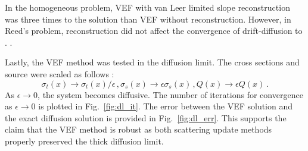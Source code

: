 In the homogeneous problem, VEF with van Leer limited slope reconstruction was three times  to the \SN solution than VEF without reconstruction. However, in Reed's problem, reconstruction did not affect the convergence of drift-diffusion to \SN. . 

Lastly, the VEF method was tested in the diffusion limit. The cross sections and source were scaled as follows \cite{diflim}: 
	\begin{subequations} \label{res:scaling}
		\begin{equation} 
			\sigma_t(x) \rightarrow \sigma_t(x)/\epsilon \,, 
		\end{equation}
		\begin{equation}
			\sigma_s(x) \rightarrow \epsilon \sigma_s(x) \,,
		\end{equation}
		\begin{equation}
			Q(x) \rightarrow \epsilon Q(x) \,. 
		\end{equation}
	\end{subequations}
As $\epsilon \rightarrow 0$, the system becomes diffusive. The number of iterations for convergence as $\epsilon \rightarrow 0$ is plotted in Fig.~\ref{fig:dl_it}. The error between the VEF solution and the exact diffusion solution is provided in Fig.~\ref{fig:dl_err}. This supports the claim that the VEF method is robust as both scattering update methods properly preserved the thick diffusion limit. 
	
